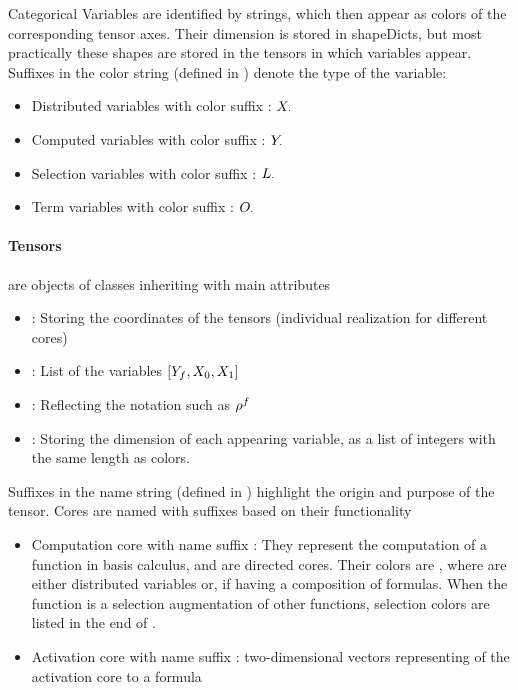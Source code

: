 \subsect{\bncategoricals}
Categorical Variables are identified by strings, which then appear as colors of the corresponding tensor axes.
Their dimension is stored in shapeDicts, but most practically these shapes are stored in the tensors in which variables appear.
Suffixes in the color string (defined in ) denote the type of the variable:
\begin{itemize}
	\item Distributed variables with color suffix \disVarSuf: $X_{\cdot}$
	\item Computed variables with color suffix \comVarSuf: $Y_{\cdot}$
	\item Selection variables with color suffix \selVarSuf: $L_{\cdot}$
	\item Term variables with color suffix \terVarSuf: $O_{\cdot}$
\end{itemize}

\subsect{\bntensors}
\paragraph{Tensors} are objects of classes inheriting  with main attributes
\begin{itemize}
	\item {}: Storing the coordinates of the tensors (individual realization for different cores)
	\item {}: List of the variables $[Y_{f},X_{0},X_{1}]$
	\item {}: Reflecting the notation such as $\rho^{f}$
	\item {}: Storing the dimension of each appearing variable, as a list of integers with the same length as colors.
\end{itemize}

Suffixes in the name string (defined in ) highlight the origin and purpose of the tensor.
Cores are named with suffixes based on their functionality
\begin{itemize}
	\item Computation core with name suffix \comCoreSuf: They represent the computation of a function in basis calculus, and are directed cores.
		Their colors are \inlinecode{[headColors] + [inputColors]}, where \inlinecode{[inputColors]} are either distributed variables or, if having a composition of formulas.
		When the function is a selection augmentation of other functions, selection colors are listed in the end of \inlinecode{[inputColors]}.
	\item Activation core with name suffix \actCoreSuf: two-dimensional vectors representing of the activation core to a formula
\end{itemize}

